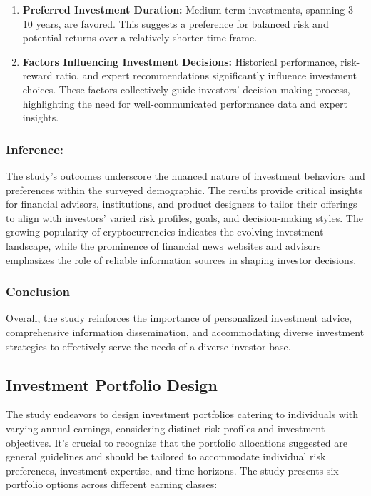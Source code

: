 \begin{enumerate}
    \item \textbf{Preferred Investment Duration:} Medium-term investments, spanning 3-10 years, are favored. This suggests a preference for balanced risk and potential returns over a relatively shorter time frame.
    
    \item \textbf{Factors Influencing Investment Decisions:} Historical performance, risk-reward ratio, and expert recommendations significantly influence investment choices. These factors collectively guide investors' decision-making process, highlighting the need for well-communicated performance data and expert insights.
\end{enumerate}

\subsubsection{Inference:}

The study's outcomes underscore the nuanced nature of investment behaviors and preferences within the surveyed demographic. The results provide critical insights for financial advisors, institutions, and product designers to tailor their offerings to align with investors' varied risk profiles, goals, and decision-making styles. The growing popularity of cryptocurrencies indicates the evolving investment landscape, while the prominence of financial news websites and advisors emphasizes the role of reliable information sources in shaping investor decisions.
\subsubsection{Conclusion}
Overall, the study reinforces the importance of personalized investment advice, comprehensive information dissemination, and accommodating diverse investment strategies to effectively serve the needs of a diverse investor base.


\subsection{Investment Portfolio Design}

The study endeavors to design investment portfolios catering to individuals with varying annual earnings, considering distinct risk profiles and investment objectives. It's crucial to recognize that the portfolio allocations suggested are general guidelines and should be tailored to accommodate individual risk preferences, investment expertise, and time horizons. The study presents six portfolio options across different earning classes:

